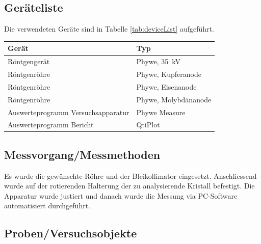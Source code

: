 \clearpage
\subsection{Ger\"ateliste}
\label{subsec:deviceList}

Die verwendeten Ger\"ate sind in Tabelle \ref{tab:deviceList} aufgef\"uhrt.

\begin{center}
    \label{tab:deviceList}
    \begin{tabular}{ll}
        \toprule
        Ger\"at & Typ \\
        \midrule
        R\"ontgenger\"at & Phywe, \SI{35}{\kilo\volt} \\
        R\"ontgenr\"ohre & Phywe, Kupferanode \\
        R\"ontgenr\"ohre & Phywe, Eisenanode \\
        R\"ontgenr\"ohre & Phywe, Molybd\"ananode \\
        Auswerteprogramm Versuchsapparatur              & Phywe Measure \\
        Auswerteprogramm Bericht              & QtiPlot \\
        \bottomrule
    \end{tabular}
\end{center}


\subsection{Messvorgang/Messmethoden}
\label{subsec:measurementMethods}

Es    wurde    die    gew\"unschte     R\"ohre    und    der    Bleikollimator
eingesetzt. Anschliessend  wurde   auf  der   rotierenden  Halterung   der  zu
analysierende  Kristall befestigt. Die  Apparatur  wurde  justiert und  danach
wurde die Messung via PC-Software automatisiert durchgef\"uhrt.

\subsection{Proben/Versuchsobjekte}
\label{subsec:samples}

